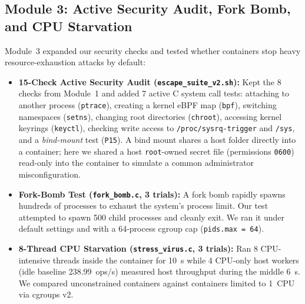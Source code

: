 \documentclass[conference]{IEEEtran}
\begin{document}
\subsection{Module 3: Active Security Audit, Fork Bomb, and CPU Starvation}
Module~3 expanded our security checks and tested whether containers stop heavy resource-exhaustion attacks by default:
\begin{itemize}
    \item \textbf{15-Check Active Security Audit (\texttt{escape\_suite\_v2.sh}):} Kept the 8 checks from Module~1 and added 7 active C system call tests: attaching to another process (\texttt{ptrace}), creating a kernel eBPF map (\texttt{bpf}), switching namespaces (\texttt{setns}), changing root directories (\texttt{chroot}), accessing kernel keyrings (\texttt{keyctl}), checking write access to \texttt{/proc/sysrq-trigger} and \texttt{/sys}, and a \textit{bind-mount} test (\texttt{P15}). A bind mount shares a host folder directly into a container; here we shared a host \texttt{root}-owned secret file (permissions \texttt{0600}) read-only into the container to simulate a common administrator misconfiguration.
    \item \textbf{Fork-Bomb Test (\texttt{fork\_bomb.c}, 3 trials):} A fork bomb rapidly spawns hundreds of processes to exhaust the system's process limit. Our test attempted to spawn 500 child processes and cleanly exit. We ran it under default settings and with a 64-process cgroup cap (\texttt{pids.max = 64}).
    \item \textbf{8-Thread CPU Starvation (\texttt{stress\_virus.c}, 3 trials):} Ran 8 CPU-intensive threads inside the container for 10~s while 4 CPU-only host workers (idle baseline 238.99~ops/s) measured host throughput during the middle 6~s. We compared unconstrained containers against containers limited to 1~CPU via cgroups v2.
\end{itemize}
\end{document}

